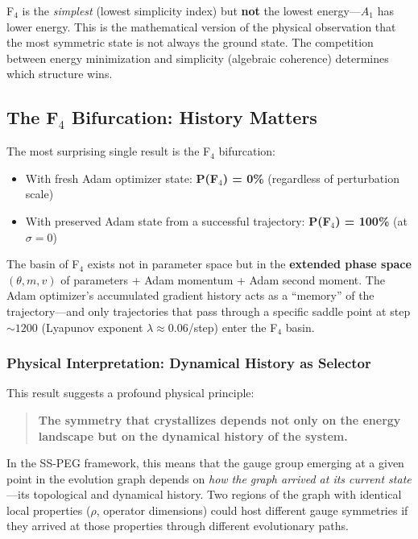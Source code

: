 F$_4$ is the \textit{simplest} (lowest simplicity index) but \textbf{not} the lowest energy---$A_1$ has lower energy. This is the mathematical version of the physical observation that the most symmetric state is not always the ground state. The competition between energy minimization and simplicity (algebraic coherence) determines which structure wins.

\subsection{The F$_4$ Bifurcation: History Matters}\label{sec:f4_bifurcation}

The most surprising single result is the F$_4$ bifurcation:

\begin{itemize}
\item With fresh Adam optimizer state: \textbf{P(F$_4$) = 0\%} (regardless of perturbation scale)
\item With preserved Adam state from a successful trajectory: \textbf{P(F$_4$) = 100\%} (at $\sigma = 0$)
\end{itemize}

The basin of F$_4$ exists not in parameter space but in the \textbf{extended phase space} $(\theta, m, v)$ of parameters + Adam momentum + Adam second moment. The Adam optimizer's accumulated gradient history acts as a ``memory'' of the trajectory---and only trajectories that pass through a specific saddle point at step $\sim 1200$ (Lyapunov exponent $\lambda \approx 0.06$/step) enter the F$_4$ basin.

\subsubsection{Physical Interpretation: Dynamical History as Selector}

This result suggests a profound physical principle:

\begin{quote}
\textbf{The symmetry that crystallizes depends not only on the energy landscape but on the dynamical history of the system.}
\end{quote}

In the SS-PEG framework, this means that the gauge group emerging at a given point in the evolution graph depends on \textit{how the graph arrived at its current state}---its topological and dynamical history. Two regions of the graph with identical local properties ($\rho$, operator dimensions) could host different gauge symmetries if they arrived at those properties through different evolutionary paths.

